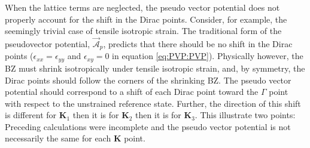 When the lattice terms are neglected, the pseudo vector potential does not properly account for the shift in the Dirac points.
Consider, for example, the seemingly trivial case of tensile isotropic strain.
The traditional form of the pseudovector potential, $\vec{\mathcal{A}}_p$, predicts that there should be no shift in the Dirac points ($\epsilon_{xx}=\epsilon_{yy}$ and $\epsilon_{xy}=0$ in equation \ref{eq:PVP:PVP}).
Physically however, the BZ must shrink isotropically under tensile isotropic strain, and, by symmetry, the Dirac points should follow the corners of the shrinking BZ.
The pseudo vector potential should correspond to a shift of each Dirac point toward the $\Gamma$ point with respect to the unstrained reference state.
Further, the direction of this shift is different for $\bm{K}_1$ then it is for $\bm{K}_2$ then it is for $\bm{K}_3$. 
This illustrate two points: Preceding calculations were incomplete and the pseudo vector potential is not necessarily the same for each $\bm{K}$ point.

